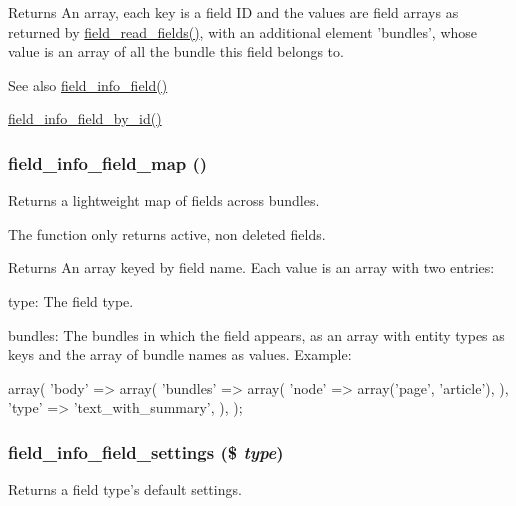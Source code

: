 \begin{DoxyReturn}{Returns}
An array, each key is a field ID and the values are field arrays as returned by \hyperlink{group__field__crud_ga0dae5c311ea301668c8906d2711fb3c5}{field\_\-read\_\-fields()}, with an additional element 'bundles', whose value is an array of all the bundle this field belongs to.
\end{DoxyReturn}
\begin{DoxySeeAlso}{See also}
\hyperlink{group__field__info_ga74cfc942cd2baa5c49780b08c5d357d4}{field\_\-info\_\-field()} 

\hyperlink{group__field__info_ga901d91feefc6639d0ad97289ae472523}{field\_\-info\_\-field\_\-by\_\-id()} 
\end{DoxySeeAlso}
\hypertarget{group__field__info_gacb01ef76f6e24f61dbd2ae56c44f7eee}{
\subsubsection[{field\_\-info\_\-field\_\-map}]{\setlength{\rightskip}{0pt plus 5cm}field\_\-info\_\-field\_\-map ()}}
\label{group__field__info_gacb01ef76f6e24f61dbd2ae56c44f7eee}
Returns a lightweight map of fields across bundles.

The function only returns active, non deleted fields.

\begin{DoxyReturn}{Returns}
An array keyed by field name. Each value is an array with two entries:
\begin{DoxyItemize}
\item type: The field type.
\item bundles: The bundles in which the field appears, as an array with entity types as keys and the array of bundle names as values. Example: 
\begin{DoxyCode}
 array(
   'body' => array(
     'bundles' => array(
       'node' => array('page', 'article'),
     ),
     'type' => 'text_with_summary',
   ),
 );
\end{DoxyCode}
 
\end{DoxyItemize}
\end{DoxyReturn}
\hypertarget{group__field__info_ga2841dd4cdcc4099f7995ddc801382b93}{
\subsubsection[{field\_\-info\_\-field\_\-settings}]{\setlength{\rightskip}{0pt plus 5cm}field\_\-info\_\-field\_\-settings (\$ {\em type})}}
\label{group__field__info_ga2841dd4cdcc4099f7995ddc801382b93}
Returns a field type's default settings.


